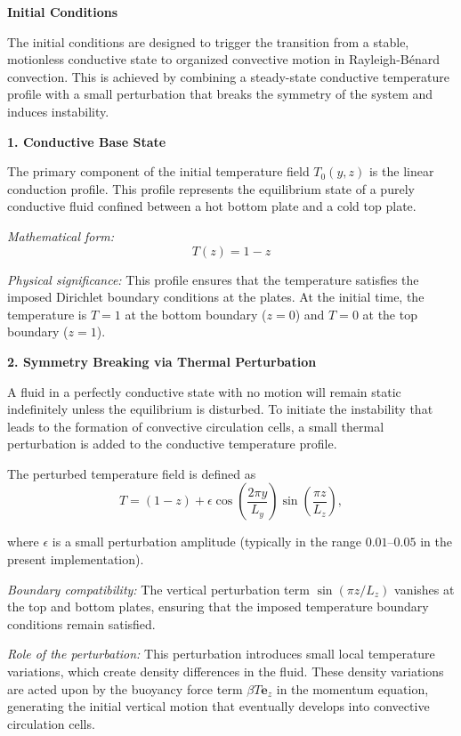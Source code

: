 \textbf{Initial Conditions}

The initial conditions are designed to trigger the transition from a stable, motionless conductive state to organized convective motion in Rayleigh-Bénard convection. This is achieved by combining a steady-state conductive temperature profile with a small perturbation that breaks the symmetry of the system and induces instability.

\textbf{1. Conductive Base State}

The primary component of the initial temperature field $T_0(y,z)$ is the linear conduction profile. This profile represents the equilibrium state of a purely conductive fluid confined between a hot bottom plate and a cold top plate.

\textit{Mathematical form:}
\begin{equation}
T(z) = 1 - z
\end{equation}

\textit{Physical significance:}  
This profile ensures that the temperature satisfies the imposed Dirichlet boundary conditions at the plates. At the initial time, the temperature is $T=1$ at the bottom boundary ($z=0$) and $T=0$ at the top boundary ($z=1$).

\textbf{2. Symmetry Breaking via Thermal Perturbation}

A fluid in a perfectly conductive state with no motion will remain static indefinitely unless the equilibrium is disturbed. To initiate the instability that leads to the formation of convective circulation cells, a small thermal perturbation is added to the conductive temperature profile.

The perturbed temperature field is defined as
\begin{equation}
T = (1 - z) + \epsilon \cos\left(\frac{2\pi y}{L_y}\right)\sin\left(\frac{\pi z}{L_z}\right),
\end{equation}

where $\epsilon$ is a small perturbation amplitude (typically in the range $0.01$--$0.05$ in the present implementation).

\textit{Boundary compatibility:}  
The vertical perturbation term $\sin(\pi z / L_z)$ vanishes at the top and bottom plates, ensuring that the imposed temperature boundary conditions remain satisfied.

\textit{Role of the perturbation:}  
This perturbation introduces small local temperature variations, which create density differences in the fluid. These density variations are acted upon by the buoyancy force term $\beta T \mathbf{e}_z$ in the momentum equation, generating the initial vertical motion that eventually develops into convective circulation cells.

